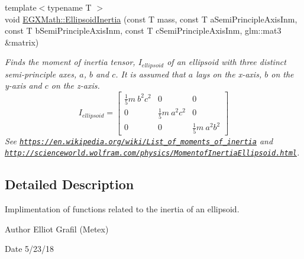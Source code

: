 \begin{DoxyCompactItemize}
{\footnotesize template$<$typename T $>$ }\\void \mbox{\hyperlink{group___e_g_x_math-_geometry-3_d-_ellipsoid-_inertia_gaed602dd93a68fdd7d4bafe883b093153}{E\+G\+X\+Math\+::\+Ellipsoid\+Inertia}} (const T mass, const T a\+Semi\+Principle\+Axis\+Inm, const T b\+Semi\+Principle\+Axis\+Inm, const T c\+Semi\+Principle\+Axis\+Inm, glm\+::mat3 \&matrix)
\begin{DoxyCompactList}\small\item\em Finds the moment of inertia tensor, $I_{ellipsoid}$ of an ellipsoid with three distinct semi-\/principle axes, $a$, $b$ and $c$. It is assumed that $a$ lays on the x-\/axis, $b$ on the y-\/axis and $c$ on the z-\/axis. \[ I_{ellipsoid}=\begin{bmatrix} \frac{1}{5}m\ b^2c^2 & 0 & 0\\ 0 & \frac{1}{5}m\ a^2c^2 & 0\\ 0 & 0 & \frac{1}{5}m\ a^2b^2 \end{bmatrix} \] See \href{https://en.wikipedia.org/wiki/List_of_moments_of_inertia}{\tt https\+://en.\+wikipedia.\+org/wiki/\+List\+\_\+of\+\_\+moments\+\_\+of\+\_\+inertia} and \href{http://scienceworld.wolfram.com/physics/MomentofInertiaEllipsoid.html}{\tt http\+://scienceworld.\+wolfram.\+com/physics/\+Momentof\+Inertia\+Ellipsoid.\+html}. \end{DoxyCompactList}\end{DoxyCompactItemize}


\subsection{Detailed Description}
Implimentation of functions related to the inertia of an ellipsoid. 

\begin{DoxyAuthor}{Author}
Elliot Grafil (Metex) 
\end{DoxyAuthor}
\begin{DoxyDate}{Date}
5/23/18 
\end{DoxyDate}
